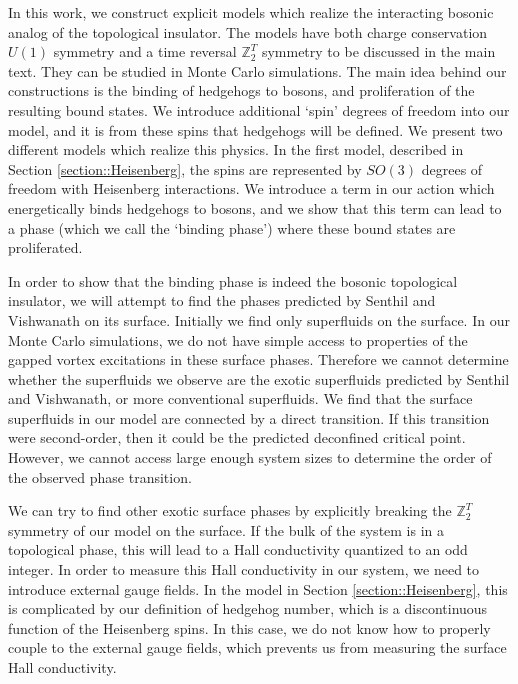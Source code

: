 \documentclass[prb,twocolumn]{revtex4-1}
\def\ztwot{\mathbb{Z}_2^T}
\begin{document}
In this work, we construct explicit models which realize the interacting bosonic analog of the topological insulator. The models have both charge conservation $U(1)$ symmetry and a time reversal $\ztwot$ symmetry to be discussed in the main text. They can be studied in Monte Carlo simulations. The main idea behind our constructions is the binding of hedgehogs to bosons, and proliferation of the resulting bound states. We introduce additional `spin' degrees of freedom into our model, and it is from these spins that hedgehogs will be defined. We present two different models which realize this physics. In the first model, described in Section \ref{section::Heisenberg}, the spins are represented by $SO(3)$ degrees of freedom with Heisenberg interactions. We introduce a term in our action which energetically binds hedgehogs to bosons, and we show that this term can lead to a phase (which we call the `binding phase') where these bound states are proliferated.

In order to show that the binding phase is indeed the bosonic topological insulator, we will attempt to find the phases predicted by Senthil and Vishwanath on its surface. Initially we find only superfluids on the surface. In our Monte Carlo simulations, we do not have simple access to properties of the gapped vortex excitations in these surface phases. Therefore we cannot determine whether the superfluids we observe are the exotic superfluids predicted by Senthil and Vishwanath, or more conventional superfluids. We find that the surface superfluids in our model are connected by a direct transition. If this transition were second-order, then it could be the predicted deconfined critical point. However, we cannot access large enough system sizes to determine the order of the observed phase transition.

We can try to find other exotic surface phases by explicitly breaking the $\ztwot$ symmetry of our model on the surface. If the bulk of the system is in a topological phase, this will lead to a Hall conductivity quantized to an odd integer. In order to measure this Hall conductivity in our system, we need to introduce external gauge fields. In the model in Section \ref{section::Heisenberg}, this is complicated by our definition of hedgehog number, which is a discontinuous function of the Heisenberg spins. %
In this case, we do not know how to properly couple to the external gauge fields, which prevents us from measuring the surface Hall conductivity.
\end{document}

